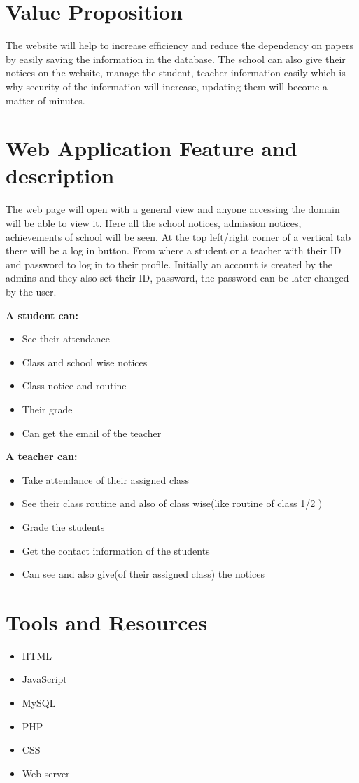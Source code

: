 \documentclass[12pt]{article}
\begin{document}
\section*{Value Proposition}

The website will help to increase efficiency and reduce the dependency on papers by easily saving the information in the database. The school can also give their notices on the website, manage the student, teacher information easily which is why security of the information will increase, updating them will become a matter of minutes. 

\section*{Web Application Feature and description}

The web page will open with a general view and anyone accessing the domain will be able to view it.  Here all the school notices, admission notices, achievements of school will be seen. At the top left/right corner of a vertical tab there will be a log in button. From where a student or a teacher with their ID and password to log in to their profile. Initially an account is created by the admins and they also set their ID, password, the password can be later changed by the user.
\setlength{\parskip}{1em}


\textbf{A student can:}
\begin{itemize}
  \item See their attendance
  \item Class and school wise notices
  \item Class notice and routine
  \item Their grade
  \item Can get the email of the teacher
\end{itemize}
\setlength{\parskip}{1em}


\textbf{A teacher can:}
\begin{itemize}
  \item Take attendance of their assigned class
  \item See their class routine and also of class wise(like routine of class 1/2 )
  \item Grade the students
  \item Get the contact information of the students
  \item Can see and also give(of their assigned class) the notices
\end{itemize}
\section*{Tools and Resources}
\begin{itemize}
  \item HTML
  \item JavaScript
  \item MySQL
  \item PHP
  \item CSS
  \item Web server
\end{itemize}
\end{document}

